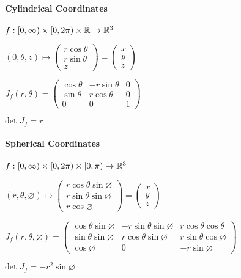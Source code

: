\paragraph{Cylindrical Coordinates}
\begin{compactitem}
    \item $f: [0, \infty) \times [0, 2 \pi) \times \mathbb{R} \to \mathbb{R}^3$
    \item $(0, \theta, z) \mapsto 
        \begin{pmatrix}
            r \cos \theta\\
            r \sin \theta\\
            z
        \end{pmatrix} =
        \begin{pmatrix}
            x\\
            y\\
            z
        \end{pmatrix}$
    \item $J_f(r, \theta) =
        \begin{pmatrix}
            \cos \theta & -r \sin \theta & 0\\
            \sin \theta & r \cos \theta & 0\\
            0 & 0 & 1
        \end{pmatrix}$
    \item $\text{det }J_f = r$
\end{compactitem}

\paragraph{Spherical Coordinates}
\begin{compactitem}
    \item $f: [0, \infty) \times [0, 2 \pi) \times [0, \pi) \to \mathbb{R}^3$
    \item $(r, \theta, \varnothing) \mapsto
        \begin{pmatrix}
            r \cos \theta \sin \varnothing\\
            r \sin \theta \sin \varnothing\\
            r \cos \varnothing
        \end{pmatrix} =
        \begin{pmatrix}
            x\\
            y\\
            z
        \end{pmatrix}$
    \item $J_f(r, \theta, \varnothing) =
        \begin{pmatrix}
            \cos \theta \sin \varnothing & -r \sin \theta \sin \varnothing & r \cos \theta \cos \theta\\
            \sin \theta \sin \varnothing & r \cos \theta \sin \varnothing & r \sin \theta \cos \varnothing\\
            \cos \varnothing & 0 & -r \sin \varnothing
        \end{pmatrix}$
    \item $\text{det } J_f = -r^2 \sin \varnothing$
\end{compactitem}

